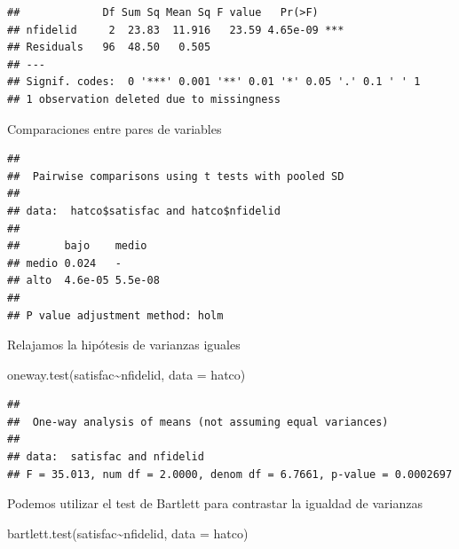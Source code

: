 \documentclass[
]{book}
\newenvironment{Shaded}{\begin{snugshade}}{\end{snugshade}}
\newcommand{\AttributeTok}[1]{\textcolor[rgb]{0.77,0.63,0.00}{#1}}
\newcommand{\FunctionTok}[1]{\textcolor[rgb]{0.00,0.00,0.00}{#1}}
\newcommand{\NormalTok}[1]{#1}
\newcommand{\SpecialCharTok}[1]{\textcolor[rgb]{0.00,0.00,0.00}{#1}}
\theoremstyle{break}
\begin{document}
\begin{verbatim}
##             Df Sum Sq Mean Sq F value   Pr(>F)    
## nfidelid     2  23.83  11.916   23.59 4.65e-09 ***
## Residuals   96  48.50   0.505                     
## ---
## Signif. codes:  0 '***' 0.001 '**' 0.01 '*' 0.05 '.' 0.1 ' ' 1
## 1 observation deleted due to missingness
\end{verbatim}

Comparaciones entre pares de variables

\begin{Shaded}
\end{Shaded}

\begin{verbatim}
## 
##  Pairwise comparisons using t tests with pooled SD 
## 
## data:  hatco$satisfac and hatco$nfidelid 
## 
##       bajo    medio  
## medio 0.024   -      
## alto  4.6e-05 5.5e-08
## 
## P value adjustment method: holm
\end{verbatim}

Relajamos la hipótesis de varianzas iguales

\begin{Shaded}
\begin{Highlighting}[]
\FunctionTok{oneway.test}\NormalTok{(satisfac}\SpecialCharTok{\textasciitilde{}}\NormalTok{nfidelid, }\AttributeTok{data =}\NormalTok{ hatco)}
\end{Highlighting}
\end{Shaded}

\begin{verbatim}
## 
##  One-way analysis of means (not assuming equal variances)
## 
## data:  satisfac and nfidelid
## F = 35.013, num df = 2.0000, denom df = 6.7661, p-value = 0.0002697
\end{verbatim}

Podemos utilizar el test de Bartlett para contrastar la igualdad de varianzas

\begin{Shaded}
\begin{Highlighting}[]
\FunctionTok{bartlett.test}\NormalTok{(satisfac}\SpecialCharTok{\textasciitilde{}}\NormalTok{nfidelid, }\AttributeTok{data =}\NormalTok{ hatco)}
\end{Highlighting}
\end{Shaded}
\end{document}
